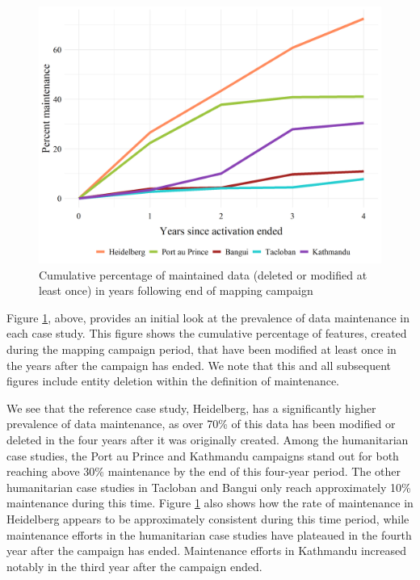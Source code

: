 \begin{figure} %
    \centering %
    \includegraphics[width = \textwidth]{Images/totmaint.png} %
    \caption[Percent of total maintained data over time.]{Cumulative percentage of maintained data (deleted or modified at least once) in years following end of mapping campaign} %
    \label{fig:tot} %
\end{figure}

Figure \ref{fig:tot}, above, provides an initial look at the prevalence of data maintenance in each case study. This figure shows the cumulative percentage of features, created during the mapping campaign period, that have been modified at least once in the years after the campaign has ended. We note that this and all subsequent figures include entity deletion within the definition of maintenance. 

We see that the reference case study, Heidelberg, has a significantly higher prevalence of data maintenance, as over 70\% of this data has been modified or deleted in the four years after it was originally created. Among the humanitarian case studies, the Port au Prince and Kathmandu campaigns stand out for both reaching above 30\% maintenance by the end of this four-year period. The other humanitarian case studies in Tacloban and Bangui only reach approximately 10\% maintenance during this time. Figure \ref{fig:tot} also shows how the rate of maintenance in Heidelberg appears to be approximately consistent during this time period, while maintenance efforts in the humanitarian case studies have plateaued in the fourth year after the campaign has ended. Maintenance efforts in Kathmandu increased notably in the third year after the campaign ended.

